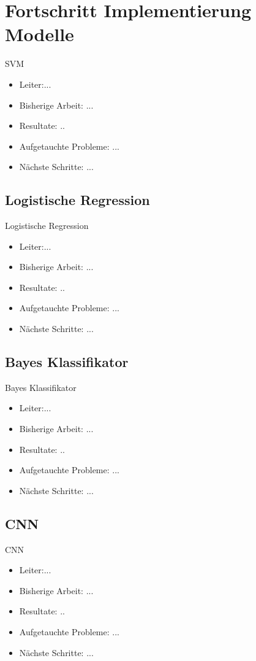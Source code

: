 \documentclass[aspectratio=169]{beamer} %
\begin{document}
\section{Fortschritt Implementierung Modelle}
\begin{frame}
  SVM
  \begin{itemize}
    \item Leiter:...
    \item Bisherige Arbeit: ...
    \item Resultate: ..
    \item Aufgetauchte Probleme: ...
    \item N\"achste Schritte: ...
  \end{itemize}
\end{frame}

\subsection{Logistische Regression}
\begin{frame}
  Logistische Regression
  \begin{itemize}
    \item Leiter:...
    \item Bisherige Arbeit: ...
    \item Resultate: ..
    \item Aufgetauchte Probleme: ...
    \item N\"achste Schritte: ...
  \end{itemize}
\end{frame}

\subsection{Bayes Klassifikator}
\begin{frame}
  Bayes Klassifikator
  \begin{itemize}
    \item Leiter:...
    \item Bisherige Arbeit: ...
    \item Resultate: ..
    \item Aufgetauchte Probleme: ...
    \item N\"achste Schritte: ...
  \end{itemize}
\end{frame}

\subsection{CNN}
\begin{frame}
  CNN
  \begin{itemize}
    \item Leiter:...
    \item Bisherige Arbeit: ...
    \item Resultate: ..
    \item Aufgetauchte Probleme: ...
    \item N\"achste Schritte: ...
  \end{itemize}
\end{frame}
\end{document}
